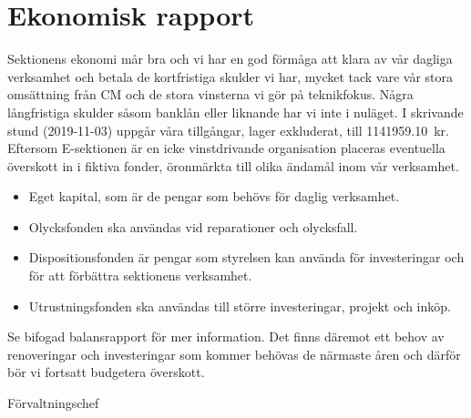\documentclass[../_main/handlingar.tex]{subfiles}
\begin{document}
\section{Ekonomisk rapport}
Sektionens ekonomi mår bra och vi har en god förmåga att klara av vår dagliga verksamhet och betala de kortfristiga skulder vi har, mycket tack vare vår stora omsättning från CM och de stora vinsterna vi gör på teknikfokus.
Några långfristiga skulder såsom banklån eller liknande har vi inte i nuläget. I skrivande stund (2019-11-03) uppgår våra tillgångar, lager exkluderat, till \SI{1141959.10}{kr}. Eftersom E-sektionen är en icke vinstdrivande organisation placeras eventuella överskott in i fiktiva fonder, öronmärkta till olika ändamål inom vår verksamhet. 

\begin{itemize}
            \item Eget kapital, som är de pengar som behövs för daglig verksamhet.
            \item Olycksfonden ska användas vid reparationer och olycksfall.
            \item Dispositionsfonden är pengar som styrelsen kan använda för investeringar och för att förbättra sektionens verksamhet. 
            \item Utrustningsfonden ska användas till större investeringar, projekt och inköp. 
\end{itemize}

Se bifogad balansrapport för mer information. Det finns däremot ett behov av renoveringar och investeringar som kommer behövas de närmaste åren och därför bör vi fortsatt budgetera överskott.

\begin{signatures}{1}
    \mvh
    \signature{Henrik Ramström}{Förvaltningschef}
\end{signatures}
\end{document}
